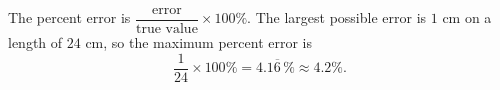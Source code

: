 The percent error is $\dfrac{\text{error}}{\text{true value}}\times100\%$. The largest possible error is $1$ cm on a length of $24$ cm, so the maximum percent error is
\[
\dfrac{1}{24}\times100\%=4.1\overline{6}\,\%\approx\boxed{4.2\%}.
\]
